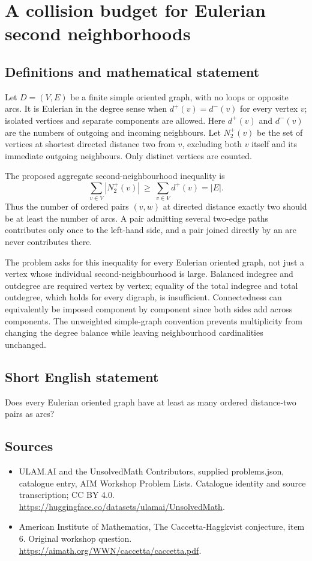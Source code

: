 \documentclass[11pt,a4paper]{article}
\begin{document}
\section*{A collision budget for Eulerian second neighborhoods}\label{statement}

\subsection{Definitions and mathematical statement}
Let $D=(V,E)$ be a finite simple oriented graph, with no loops or
opposite arcs. It is Eulerian in the degree sense when
$d^+(v)=d^-(v)$ for every vertex $v$; isolated vertices and separate
components are allowed. Here $d^+(v)$ and $d^-(v)$ are the numbers
of outgoing and incoming neighbours.
Let $N_2^+(v)$ be the set of vertices at shortest directed distance
two from $v$, excluding both $v$ itself and its immediate outgoing
neighbours. Only distinct vertices are counted.

The proposed aggregate second-neighbourhood inequality is
\[
                       \sum_{v\in V}|N_2^+(v)|
                              \ \ge\ \sum_{v\in V}d^+(v)=|E|.
\]
Thus the number of ordered pairs $(v,w)$ at directed distance exactly
two should be at least the number of arcs. A pair admitting several
two-edge paths contributes only once to the left-hand side, and a
pair joined directly by an arc never contributes there.

The problem asks for this inequality for every Eulerian oriented
graph, not just a vertex whose individual second-neighbourhood is
large. Balanced indegree and outdegree are required vertex by vertex;
equality of the total indegree and total outdegree, which holds for
every digraph, is insufficient. Connectedness can equivalently be
imposed component by component since both sides add across components.
The unweighted simple-graph convention prevents multiplicity from
changing the degree balance while leaving neighbourhood cardinalities
unchanged.
\subsection{Short English statement}
Does every Eulerian oriented graph have at least as many ordered distance-two pairs as arcs?
\subsection{Sources}
\begin{itemize}
\item[S1] ULAM.AI and the UnsolvedMath Contributors, supplied problems.json, catalogue entry, AIM Workshop Problem Lists. Catalogue identity and source transcription; CC BY 4.0.
\url{https://huggingface.co/datasets/ulamai/UnsolvedMath}.
\item[S2] American Institute of Mathematics, The Caccetta-Haggkvist conjecture, item 6. Original workshop question.
\url{https://aimath.org/WWN/caccetta/caccetta.pdf}.
\end{itemize}
\end{document}
